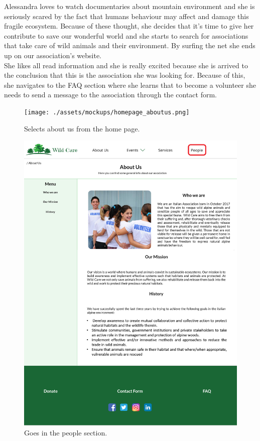 Alessandra loves to watch documentaries about mountain environment and she is seriously scared by the fact that humans behaviour may affect and damage this fragile ecosystem. Because of these thought, she decides that it's time to give her contribute to save our wonderful world and she starts to search for associations that take care of wild animals and their environment. By surfing the net she ends up on our association's website. \\
She likes all read information and she is really excited because she is arrived to the conclusion that this is the association she was looking for. Because of this, she navigates to the FAQ section where she learns that to become a volunteer she needs to send a message to the association through the contact form.

	\begin{figure}[h!]
		\centering
		\begin{minipage}[b]{0.8\textwidth}
    			\texttt{[image: ./assets/mockups/homepage\_aboutus.png]}
			\caption{Selects about us from the home page.}
		\end{minipage}
	\end{figure}

	\begin{figure}[h!]
		\centering
		\begin{minipage}[b]{1\textwidth}
    			\includegraphics[width=\textwidth]{./assets/mockups/aboutus_people.png}
			\caption{Goes in the people section.}
		\end{minipage}
	\end{figure}

